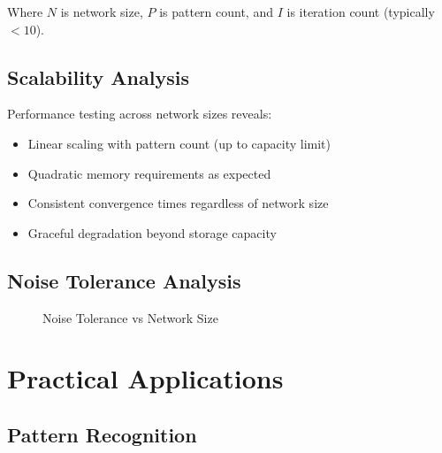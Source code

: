 \documentclass[11pt,a4paper]{article}
\begin{document}
Where $N$ is network size, $P$ is pattern count, and $I$ is iteration count (typically $< 10$).

\subsection{Scalability Analysis}

Performance testing across network sizes reveals:

\begin{itemize}
    \item Linear scaling with pattern count (up to capacity limit)
    \item Quadratic memory requirements as expected
    \item Consistent convergence times regardless of network size
    \item Graceful degradation beyond storage capacity
\end{itemize}

\subsection{Noise Tolerance Analysis}

\begin{figure}[H]
\centering
{}
\caption{Noise Tolerance vs Network Size}
\label{fig:noise_tolerance}
\end{figure}

\section{Practical Applications}

\subsection{Pattern Recognition}
\end{document}

